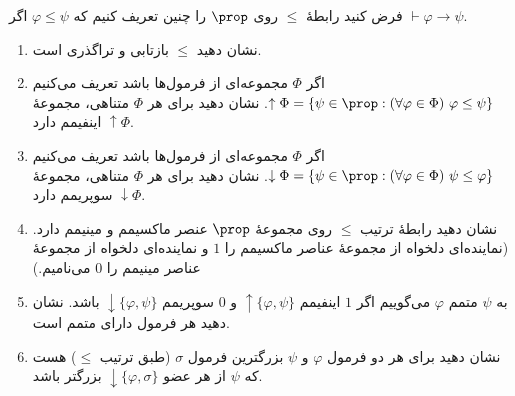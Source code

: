 فرض کنید رابطهٔ
$\leq$
روی
$\prop$
را چنین تعریف کنیم که
$\varphi\leq\psi$
اگر
$\vdash\varphi\to\psi$.
\begin{enumerate}[label=(\alph*)]
    \item نشان دهید
    $\leq$
    بازتابی و تراگذری است.%
    \item اگر
    $\Phi$
    مجموعه‌ای از فرمول‌ها باشد تعریف می‌کنیم
    $\uparrow\Phi=\{\psi\in\prop : (\forall\varphi\in\Phi)\ \varphi\leq\psi\}$.
    نشان دهید برای هر
    $\Phi$
    متناهی، مجموعهٔ
    $\uparrow\Phi$
    اینفیمم دارد.
    \item اگر
    $\Phi$
    مجموعه‌ای از فرمول‌ها باشد تعریف می‌کنیم
    $\downarrow\Phi=\{\psi\in\prop : (\forall\varphi\in\Phi)\ \psi\leq\varphi\}$.
    نشان دهید برای هر
    $\Phi$
    متناهی، مجموعهٔ
    $\downarrow\Phi$
    سوپریمم دارد.
    \item نشان دهید رابطهٔ ترتیب
    $\leq$
    روی مجموعهٔ
    $\prop$
    عنصر ماکسیمم و مینیمم دارد.
    (نماینده‌ای دلخواه از مجموعهٔ عناصر ماکسیمم را $1$ و نماینده‌ای دلخواه از مجموعهٔ عناصر مینیمم را $0$ می‌نامیم.)
    \item به
    $\psi$
    متمم
    $\varphi$
    می‌گوییم اگر
    $1$
    اینفیمم
    $\uparrow\{\varphi,\psi\}$
    و
    $0$
    سوپریمم
    $\downarrow\{\varphi,\psi\}$
    باشد. نشان دهید هر فرمول دارای متمم است.
    \item نشان دهید برای هر دو فرمول
    $\varphi$
    و
    $\psi$
    بزرگترین فرمول
    $\sigma$
    (طبق ترتیب $\leq$)
    هست که
    $\psi$
    از هر عضو
    $\downarrow\{\varphi,\sigma\}$
    بزرگتر باشد.
\end{enumerate}\quad\vspace{-9mm}
